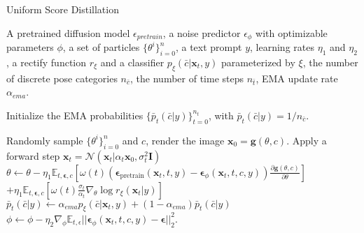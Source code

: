 \begin{algorithm}[t]
    \caption{Uniform Score Distillation}
    \begin{algorithmic}[1]\label{alg:usd}
        \REQUIRE A pretrained diffusion model $\epsilon_{pretrain}$, a noise predictor $\epsilon_\phi$ with optimizable parameters $\phi$, a set of particles $\{\theta^i\}_{i=0}^n$, a text prompt $y$, learning rates $\eta_1$ and $\eta_2$, a rectify function $r_\xi$ and a classifier $p_{\xi}(\bar{c}|\boldsymbol{x}_{t},y)$ parameterized by $\xi$, the number of discrete pose categories $n_{\bar{c}}$, the number of time steps $n_{\bar{t}}$, EMA update rate $\alpha_{ema}$.

        Initialize the EMA probabilities $\{\bar{p}_t(\bar{c}|y)\}_{t=0}^{n_t}$, with $\bar{p}_t(\bar{c}|y) = 1 / n_{\bar{c}}$.

            \STATE Randomly sample $\{\theta^i\}_{i=0}^n$ and $c$, render the image $\boldsymbol{x}_0=\boldsymbol{g}(\theta,c)$.
            \STATE Apply a forward step $\boldsymbol{x}_t=\mathcal{N}(\boldsymbol{x}_t|\alpha_t\boldsymbol{x}_0,\sigma_t^2\boldsymbol{I})$
            \STATE $\theta\leftarrow\theta-\eta_1\mathbb{E}_{t,\boldsymbol{\epsilon},c}\left[\omega(t)\left(\boldsymbol{\epsilon}_{\mathrm{pretrain}}(\boldsymbol{x}_t,t,y)-\boldsymbol{\epsilon}_\phi(\boldsymbol{x}_t,t,c,y)\right)\frac{\partial\boldsymbol{g}(\theta,c)}{\partial\theta}\right]$ \\
            \hspace{10mm} $+ \eta_1\mathbb{E}_{t,\boldsymbol{\epsilon},c}\left[\omega(t)\frac{\sigma_t}{\alpha_t}\nabla_{\theta}\log r_\xi (\boldsymbol{x}_t|y)\right]$
            \STATE $\bar{p}_t(\bar{c}|y) \leftarrow \alpha_{ema}p_{\xi}(\bar{c}|\boldsymbol{x}_{t},y) + (1 - \alpha_{ema})\bar{p}_t(\bar{c}|y)$
            \STATE $\phi\leftarrow\phi-\eta_2\nabla_\phi\mathbb{E}_{t,\epsilon}||\boldsymbol{\epsilon}_\phi(\boldsymbol{x}_t,t,c,y)-\boldsymbol{\epsilon}||_2^2.$
        \ENDWHILE
        \RETURN
    \end{algorithmic}
\end{algorithm}

